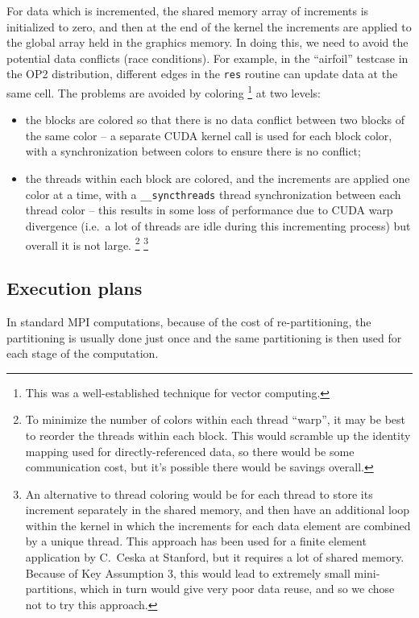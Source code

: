 \documentclass[12pt]{article}
\begin{document}
For data which is incremented, the shared memory array of increments is
initialized to zero, and then at the end of the kernel the increments are
applied to the global array held in the graphics memory.  In doing this,
we need to avoid the potential data conflicts (race conditions).
For example, in the ``airfoil'' testcase in the OP2 distribution,
different edges in the {\tt res} routine can update data at the same
cell.  The problems are avoided by coloring
\footnote{This was a well-established technique for vector computing.}
at two levels:
\begin{itemize}
\item
the blocks are colored so that there is no data conflict between two
blocks of the same color -- a separate CUDA kernel call is used for each
block color, with a synchronization between colors to ensure there is no
conflict;
\item
the threads within each block are colored, and the increments are applied
one color at a time, with a {\tt \_\_syncthreads} thread synchronization
between each thread color -- this results in some loss of performance due
to CUDA warp divergence (i.e.~a lot of threads are idle during this
incrementing process) but overall it is not large.
\footnote{To minimize the number of colors within each thread ``warp'',
it may be best to reorder the threads within each block.  This would
scramble up the identity mapping used for directly-referenced data,
so there would be some communication cost, but it's possible there would
be savings overall.}
\footnote{
An alternative to thread coloring would be for each thread to store its
increment separately in the shared memory, and then have an additional loop
within the kernel in which the increments for each data element are combined
by a unique thread.  This approach has been used for a finite element
application by C.~Ceska at Stanford, but it requires a lot of shared memory.
Because of Key Assumption 3, this would lead to extremely small
mini-partitions, which in turn would give very poor data reuse, and so
we chose not to try this approach.}

\end{itemize}


\subsection{Execution plans}

In standard MPI computations, because of the cost of re-partitioning,
the partitioning is usually done just once and the same partitioning is
then used for each stage of the computation.
\end{document}
